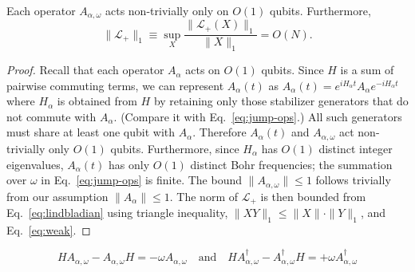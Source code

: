 \begin{prop}
\label{prop:Lindblad}
Each operator $A_{\alpha,\omega}$ acts non-trivially only on $O(1)$ qubits.
Furthermore,
\[
 \| \mathcal L_+ \|_1 \equiv \sup_X \frac{ \| \mathcal L_+(X) \|_1 }{ \| X \|_1 }  = O(N).
\]
\end{prop}
\begin{proof}
Recall that each operator $A_\alpha$ acts on $O(1)$ qubits.
Since $H$ is a sum of pairwise commuting terms, we can represent
$A_\alpha(t)$ as  $A_\alpha(t)=e^{iH_\alpha t} A_\alpha e^{-iH_\alpha t}$
where $H_\alpha$ is obtained from $H$ by retaining only those stabilizer generators that do not
commute with $A_\alpha$.
(Compare it with Eq.~\eqref{eq:jump-ops}.)
All such generators must share at least one qubit with $A_\alpha$.
Therefore  $A_\alpha(t)$ and $A_{\alpha,\omega}$ act non-trivially only $O(1)$ qubits.
Furthermore, since $H_\alpha$ has $O(1)$ distinct integer eigenvalues,
$A_\alpha(t)$ has only $O(1)$ distinct Bohr frequencies;
the summation over $\omega$ in Eq.~\eqref{eq:jump-ops} is finite.
The bound $\| A_{\alpha,\omega} \|\le 1$ follows trivially from our assumption $\| A_\alpha\|\le 1$.
The norm of $\mathcal{L}_+$ is then
bounded from Eq.~\eqref{eq:lindbladian} using triangle inequality, $\| X Y \|_1 \le \| X \| \cdot \| Y \|_1$, and Eq.~\eqref{eq:weak}.
\end{proof}
\begin{prop}
\begin{equation}
\label{Acom}
H A_{\alpha,\omega} - A_{\alpha,\omega}H  = - \omega A_{\alpha,\omega} \quad \text{and} \quad
H A_{\alpha,\omega}^\dag  - A_{\alpha,\omega}^\dag H =  + \omega A_{\alpha,\omega}^\dag
\end{equation}
\end{prop}
